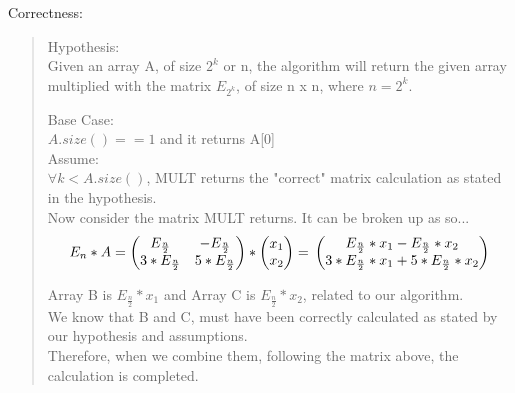 \documentclass[11pt,letter]{article}
\newcommand{\2}{\{0, 1\}}
\newcommand{\1}{\mathds{1}}
\theoremstyle{definition}
\begin{document}
Correctness:
\begin{quote}
Hypothesis: \\
Given an array A, of size $2^k$ or n, the algorithm will return the given array multiplied with the matrix $E_{2^k}$, of size n x n, where $n = 2^k$.

Base Case:\\

$A.size() == 1$ and it returns A[0] \checkmark \\

Assume: \\
$\forall k < A.size()$, MULT returns the "correct" matrix calculation as stated in the hypothesis.\\

Now consider the matrix MULT returns. It can be broken up as so...\\
\begin{equation}
	E_n * A = 
	\left (\begin{matrix}
		E_{\frac{n}{2}} & -E_{\frac{n}{2}}\\
		3 * E_{\frac{n}{2}} & 5 * E_{\frac{n}{2}}\\
	\end{matrix}\right)
	*
	\left (\begin{matrix}
		x_1\\
		x_2
	\end{matrix}\right) =
	\\
	\left(\begin{matrix}
		E_{\frac{n}{2}} * x_1 - E_{\frac{n}{2}} * x_2\\
		3 * E_{\frac{n}{2}} * x_1 + 5 * E_{\frac{n}{2}} * x_2
	\end{matrix}\right) 
\end{equation}

Array B is $E_{\frac{n}{2}} * x_1$ and Array C is $E_{\frac{n}{2}} * x_2$, related to our algorithm.\\
We know that B and C, must have been correctly calculated as stated by our hypothesis and assumptions.\\
Therefore, when we combine them, following the matrix above, the calculation is completed.


\end{quote}
\end{document}

